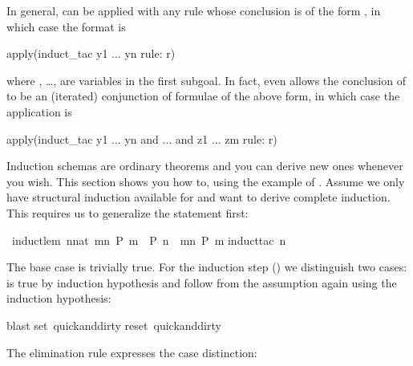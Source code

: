 \begin{isabellebody}
\begin{isamarkuptext}
In general,  can be applied with any rule 
whose conclusion is of the form , in which case the
format is
\begin{ttbox}
apply(induct_tac y1 ... yn rule: r)
\end{ttbox}%
where , \dots,  are variables in the first subgoal.
In fact,  even allows the conclusion of
 to be an (iterated) conjunction of formulae of the above form, in
which case the application is
\begin{ttbox}
apply(induct_tac y1 ... yn and ... and z1 ... zm rule: r)
\end{ttbox}%
\end{isamarkuptext}%
%
%
\begin{isamarkuptext}%
\label{sec:derive-ind}
Induction schemas are ordinary theorems and you can derive new ones
whenever you wish.  This section shows you how to, using the example
of . Assume we only have structural induction
available for  and want to derive complete induction. This
requires us to generalize the statement first:%
\end{isamarkuptext}%
\ induct{\isacharunderscore}lem{\isacharcolon}\ {\isachardoublequote}{\isacharparenleft}{\isasymAnd}n{\isacharcolon}{\isacharcolon}nat{\isachardot}\ {\isasymforall}m{\isacharless}n{\isachardot}\ P\ m\ {\isasymLongrightarrow}\ P\ n{\isacharparenright}\ {\isacharequal}{\isacharequal}{\isachargreater}\ {\isasymforall}m{\isacharless}n{\isachardot}\ P\ m{\isachardoublequote}\isanewline
{}induct{\isacharunderscore}tac\ n{\isacharparenright}%
\begin{isamarkuptxt}%
\noindent
The base case is trivially true. For the induction step () we distinguish two cases:  is true by induction
hypothesis and  follow from the assumption again using
the induction hypothesis:%
\end{isamarkuptxt}%
blast{\isacharparenright}\isanewline
\isanewline
{}set\ quick{\isacharunderscore}and{\isacharunderscore}dirty{\isachardoublequote}\isanewline
{}\isanewline
{}reset\ quick{\isacharunderscore}and{\isacharunderscore}dirty{\isachardoublequote}%
\begin{isamarkuptext}%
\noindent
The elimination rule  expresses the case distinction:
\begin{quote}


\end{quote}
\end{isamarkuptext}
\end{isabellebody}
